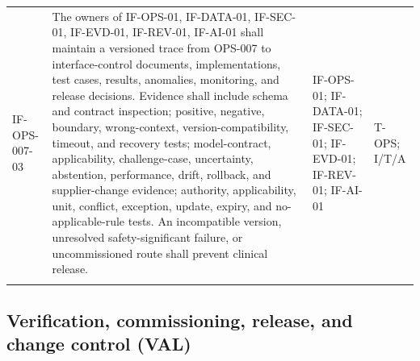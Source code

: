 \documentclass[11pt,letterpaper]{article}
\begin{document}
\begin{scriptsize}
\begin{longtable}{@{}L{0.14\textwidth}L{0.49\textwidth}L{0.19\textwidth}L{0.10\textwidth}@{}}
\addlinespace[2pt]
\mbox{IF-OPS-007-03} & The owners of IF-OPS-01, IF-DATA-01, IF-SEC-01, IF-EVD-01, IF-REV-01, IF-AI-01 shall maintain a versioned trace from OPS-007 to interface-control documents, implementations, test cases, results, anomalies, monitoring, and release decisions. Evidence shall include schema and contract inspection; positive, negative, boundary, wrong-context, version-compatibility, timeout, and recovery tests; model-contract, applicability, challenge-case, uncertainty, abstention, performance, drift, rollback, and supplier-change evidence; authority, applicability, unit, conflict, exception, update, expiry, and no-applicable-rule tests. An incompatible version, unresolved safety-significant failure, or uncommissioned route shall prevent clinical release. & IF-OPS-01; IF-DATA-01; IF-SEC-01; IF-EVD-01; IF-REV-01; IF-AI-01 & T-OPS; I\slash\allowbreak{}T\slash\allowbreak{}A \\
\addlinespace[2pt]
\end{longtable}
\end{scriptsize}

\subsection{Verification, commissioning, release, and change control (VAL)}
\end{document}

